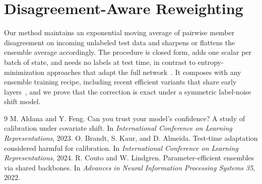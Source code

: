 \documentclass[10pt]{article}
\begin{document}
\section{Disagreement-Aware Reweighting}
Our method maintains an exponential moving average of pairwise member
disagreement on incoming unlabeled test data and sharpens or flattens the
ensemble average accordingly. The procedure is closed form, adds one scalar
per batch of state, and needs no labels at test time, in contrast to
entropy-minimization approaches that adapt the full
network~\cite{brandt2024tta}. It composes with any ensemble training recipe,
including recent efficient variants that share early
layers~\cite{couto2022batchens}, and we prove that the correction is exact
under a symmetric label-noise shift model.

\begin{thebibliography}{9}
 M. Aldana and Y. Feng.
Can you trust your model's confidence? A study of calibration under covariate shift.
In \textit{International Conference on Learning Representations}, 2023.
 O. Brandt, S. Kaur, and D. Almeida.
Test-time adaptation considered harmful for calibration.
In \textit{International Conference on Learning Representations}, 2024.
 R. Couto and W. Lindgren.
Parameter-efficient ensembles via shared backbones.
In \textit{Advances in Neural Information Processing Systems 35}, 2022.
\end{thebibliography}
\end{document}
